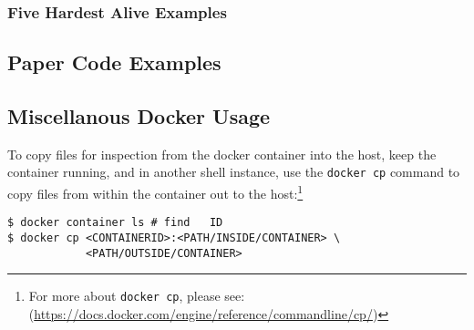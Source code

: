 \documentclass{sigplanconf}
\begin{document}
\subsubsection{Five Hardest Alive Examples}
\subsection{Paper Code Examples}
\subsection{Miscellanous Docker Usage}
To copy files for inspection from the docker container into the host,
 keep the container running, and in another
shell instance, use the \texttt{docker cp}
command to copy files from within the container out to the host:\footnote{For more about \texttt{docker cp}, please see: (\url{https://docs.docker.com/engine/reference/commandline/cp/})}

\begin{verbatim}
$ docker container ls # find   ID
$ docker cp <CONTAINERID>:<PATH/INSIDE/CONTAINER> \
            <PATH/OUTSIDE/CONTAINER>
\end{verbatim}





\end{document}
